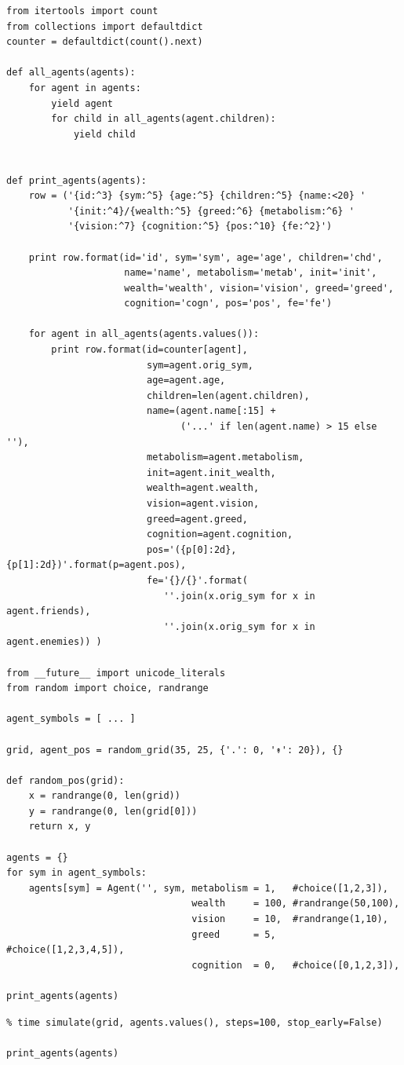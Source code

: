 \begin{verbatim}
from itertools import count
from collections import defaultdict
counter = defaultdict(count().next)

def all_agents(agents):
    for agent in agents:
        yield agent
        for child in all_agents(agent.children):
            yield child
            
    
def print_agents(agents):
    row = ('{id:^3} {sym:^5} {age:^5} {children:^5} {name:<20} ' 
           '{init:^4}/{wealth:^5} {greed:^6} {metabolism:^6} '
           '{vision:^7} {cognition:^5} {pos:^10} {fe:^2}')

    print row.format(id='id', sym='sym', age='age', children='chd', 
                     name='name', metabolism='metab', init='init', 
                     wealth='wealth', vision='vision', greed='greed', 
                     cognition='cogn', pos='pos', fe='fe')

    for agent in all_agents(agents.values()):
        print row.format(id=counter[agent],
                         sym=agent.orig_sym, 
                         age=agent.age,
                         children=len(agent.children),
                         name=(agent.name[:15] + 
                               ('...' if len(agent.name) > 15 else ''),
                         metabolism=agent.metabolism,
                         init=agent.init_wealth,
                         wealth=agent.wealth,
                         vision=agent.vision,
                         greed=agent.greed,
                         cognition=agent.cognition,
                         pos='({p[0]:2d}, {p[1]:2d})'.format(p=agent.pos),
                         fe='{}/{}'.format(
                            ''.join(x.orig_sym for x in agent.friends),
                            ''.join(x.orig_sym for x in agent.enemies)) )

from __future__ import unicode_literals
from random import choice, randrange

agent_symbols = [ ... ]

grid, agent_pos = random_grid(35, 25, {'.': 0, '↟': 20}), {}

def random_pos(grid):
    x = randrange(0, len(grid))
    y = randrange(0, len(grid[0]))
    return x, y

agents = {}
for sym in agent_symbols:
    agents[sym] = Agent('', sym, metabolism = 1,   #choice([1,2,3]),                                  
                                 wealth     = 100, #randrange(50,100), 
                                 vision     = 10,  #randrange(1,10),
                                 greed      = 5,   #choice([1,2,3,4,5]),
                                 cognition  = 0,   #choice([0,1,2,3]),
                                 
print_agents(agents)
\end{verbatim}

\begin{verbatim}
% time simulate(grid, agents.values(), steps=100, stop_early=False)

print_agents(agents)
\end{verbatim}

\blankpage
\blankpage

